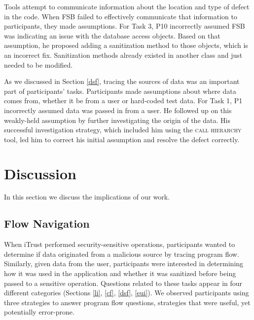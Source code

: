 \documentclass[10pt,journal,compsoc]{IEEEtran}
\begin{document}
Tools attempt to communicate information about the location and type of defect in the code.
When FSB failed to effectively communicate that information to participants, they made assumptions.
For Task 3, P10 incorrectly assumed FSB was indicating an issue with the database access objects. 
Based on that assumption, he proposed adding a sanitization method to those objects, which is an incorrect fix.
Sanitization methods already existed in another class and just needed to be modified.


As we discussed in Section \ref{dsf}, tracing the sources of data was an important part of participants' tasks.
Participants made assumptions about where data comes from, whether it be from a user or hard-coded test data.
For Task 1, P1 incorrectly assumed data was passed in from a user.
He followed up on this weakly-held assumption by further investigating the origin of the data.
His successful investigation strategy, which included him using the \textsc{call hierarchy} tool, led him to correct his initial assumption and resolve the defect correctly.






\section{Discussion}
\label{sec:discussion}
In this section we discuss the implications of our work.

\subsection{Flow Navigation}
\label{flowNav}
When iTrust performed security-sensitive operations, participants wanted to determine if data originated from a malicious source
by tracing program flow.
Similarly, given data from the user, participants were interested in determining how it was used in the application and whether it was sanitized before being passed to a sensitive operation. Questions related to these tasks appear in four different categories (Sections \ref{li}, \ref{cf}, \ref{dsf}, \ref{eui}).
We observed participants using three strategies to answer program flow questions,
strategies that were useful, yet potentially error-prone.
\end{document}
